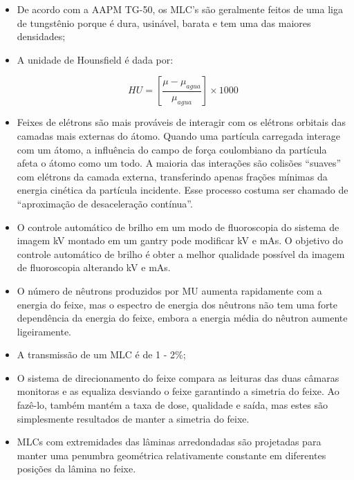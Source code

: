 \documentclass[11pt,a4paper]{article}
\begin{document}
\begin{itemize}
    \item De acordo com a AAPM TG-50, os MLC's são geralmente feitos de uma liga de tungstênio porque é dura, usinável, barata e tem uma das maiores densidades;
    
    \item A unidade de Hounsfield é dada por:
    
        \begin{equation*}
            HU = \left[\frac{\mu - \mu_{agua}}{\mu_{agua}}\right] \times 1000
        \end{equation*}
    \item Feixes de elétrons são mais prováveis de interagir com os elétrons orbitais das camadas mais externas do átomo. Quando uma partícula carregada interage com um átomo, a influência do campo de força coulombiano da partícula afeta o átomo como um todo. A maioria das interações são colisões “suaves” com elétrons da camada externa, transferindo apenas frações mínimas da energia cinética da partícula incidente. Esse processo costuma ser chamado de “aproximação de desaceleração contínua”.
    
    \item O controle automático de brilho em um modo de fluoroscopia do sistema de imagem kV montado em um gantry pode modificar kV e mAs. O objetivo do controle automático de brilho é obter a melhor qualidade possível da imagem de fluoroscopia alterando kV e mAs.
    
    \item O número de nêutrons produzidos por MU aumenta rapidamente com a energia do feixe, mas o espectro de energia dos nêutrons não tem uma forte dependência da energia do feixe, embora a energia média do nêutron aumente ligeiramente.
    
    \item A transmissão de um MLC é de 1 - 2\%; 
    
    \item O sistema de direcionamento do feixe compara as leituras das duas câmaras monitoras e as equaliza desviando o feixe garantindo a simetria do feixe. Ao fazê-lo, também mantém a taxa de dose, qualidade e saída, mas estes são simplesmente resultados de manter a simetria do feixe.
    
    \item MLCs com extremidades das lâminas arredondadas são projetadas para manter uma penumbra geométrica relativamente constante em diferentes posições da lâmina no feixe.
    

\end{itemize}
\end{document}
